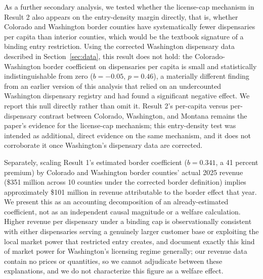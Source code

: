 \documentclass[12pt]{article}
\begin{document}
As a further secondary analysis, we tested whether the license-cap mechanism in Result 2 also appears on the
entry-density margin directly, that is, whether Colorado and Washington border counties have systematically
fewer dispensaries per capita than interior counties, which would be the textbook signature of a binding
entry restriction. Using the corrected Washington dispensary data described in Section~\ref{sec:data}, this
result does not hold: the Colorado-Washington border coefficient on dispensaries per capita is small and
statistically indistinguishable from zero ($b=-0.05$, $p=0.46$), a materially different finding from an
earlier version of this analysis that relied on an undercounted Washington dispensary registry and had found
a significant negative effect. We report this null directly rather than omit it. Result 2's per-capita
versus per-dispensary contrast between Colorado, Washington, and Montana remains the paper's evidence for the
license-cap mechanism; this entry-density test was intended as additional, direct evidence on the same
mechanism, and it does not corroborate it once Washington's dispensary data are corrected.

Separately, scaling Result 1's estimated border coefficient ($b=0.341$, a 41 percent premium) by Colorado and
Washington border counties' actual 2025 revenue (\$351 million across 10 counties under the corrected border
definition) implies approximately \$101 million in revenue attributable to the border effect that year. We
present this as an accounting decomposition of an already-estimated coefficient, not as an independent
causal magnitude or a welfare calculation. Higher revenue per dispensary under a binding cap is
observationally consistent with either dispensaries serving a genuinely larger customer base or exploiting
the local market power that restricted entry creates, and \citet{HollenbeckUetake2021} document exactly this
kind of market power for Washington's licensing regime generally; our revenue data contain no prices or
quantities, so we cannot adjudicate between these explanations, and we do not characterize this figure as a
welfare effect.
\end{document}
